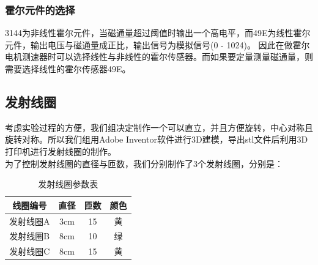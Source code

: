 \documentclass[conference]{IEEEtran}
\theoremstyle{break}
\begin{document}
\subsubsection{霍尔元件的选择}
3144为非线性霍尔元件，当磁通量超过阈值时输出一个高电平，而49E为线性霍尔元件，输出电压与磁通量成正比，输出信号为模拟信号(0 - 1024)。
因此在做霍尔电机测速器时可以选择线性与非线性的霍尔传感器。而如果要定量测量磁通量，则需要选择线性的霍尔传感器49E。

\subsection{发射线圈}
考虑实验过程的方便，我们组决定制作一个可以直立，并且方便旋转，中心对称且旋转对称。所以我们组用Adobe Inventor软件进行3D建模，导出stl文件后利用3D打印机进行发射线圈的制作。\\
为了控制发射线圈的直径与匝数，我们分别制作了3个发射线圈，分别是：

\begin{table}[htbp]
        \caption{发射线圈参数表}
        \begin{center}
        \begin{tabular}{|c|c|c|c|}
        \hline
        \textbf{线圈编号}&\textbf{直径} & \textbf{匝数}& \textbf{颜色} \\
        \hline
        发射线圈A&3cm&15&黄\\
        \hline
        发射线圈B&8cm&10&绿\\
        \hline
        发射线圈C&8cm&15&黄\\
        \hline
        \end{tabular}
        \label{tab1}
        \end{center}
        \end{table}
\end{document}
